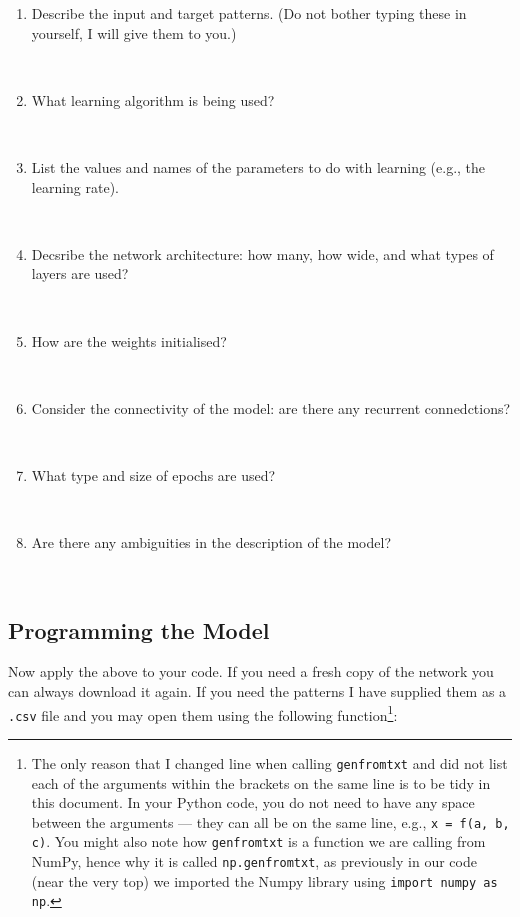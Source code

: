 \documentclass[a4paper,10pt]{article}
\begin{document}
\begin{enumerate}

\item Describe the input and target patterns. (Do not bother typing these in yourself, I will give them to you.)

\ \\

\item What learning algorithm is being used?

\ \\

 \item List the values and names of the parameters to do with learning (e.g., the learning rate).

\ \\

\item Decsribe the network architecture: how many, how wide, and what types of layers are used?

\ \\

\item How are the weights initialised?

\ \\

\item Consider the connectivity of the model: are there any recurrent connedctions?

\ \\

\item What type and size of epochs are used?

\ \\

 \item Are there any ambiguities in the description of the model?
 
\ \\

\end{enumerate}

\subsection{Programming the Model}


Now apply the above to your code. If you need a fresh copy of the network you can always download it again. If you need the patterns I have supplied them as a \texttt{.csv} file and you may open them using the following function\footnote{The only reason that I changed line when calling \texttt{genfromtxt} and did not list each of the arguments within the brackets on the same line is to be tidy in this document. In your Python code, you do not need to have any space between the arguments --- they can all be on the same line, e.g., \texttt{x = f(a, b, c)}. You might also note how \texttt{genfromtxt} is a function we are calling from NumPy, hence why it is called \texttt{np.genfromtxt}, as previously in our code (near the very top) we imported the Numpy library using \texttt{import numpy as np}.}:
\end{document}
